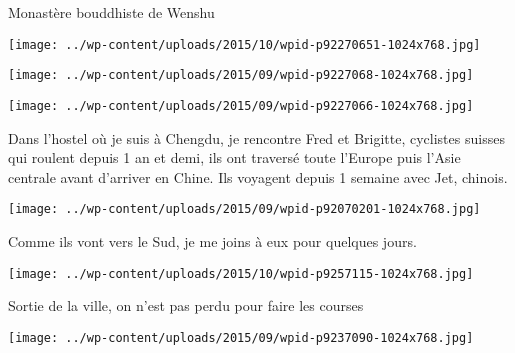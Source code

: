  

 Monastère bouddhiste de Wenshu 

 

\begin{center} \texttt{[image: ../wp-content/uploads/2015/10/wpid-p92270651-1024x768.jpg]} \end{center}

 

 

\begin{center} \texttt{[image: ../wp-content/uploads/2015/09/wpid-p9227068-1024x768.jpg]} \end{center}

 

 

\begin{center} \texttt{[image: ../wp-content/uploads/2015/09/wpid-p9227066-1024x768.jpg]} \end{center}

 

 Dans l'hostel où je suis à Chengdu, je rencontre Fred et Brigitte, cyclistes suisses qui roulent depuis 1 an et demi, ils ont traversé toute l'Europe puis l'Asie centrale avant d'arriver en Chine. Ils voyagent depuis 1 semaine avec Jet, chinois. 

 

\begin{center} \texttt{[image: ../wp-content/uploads/2015/09/wpid-p92070201-1024x768.jpg]} \end{center}

 

 Comme ils vont vers le Sud, je me joins à eux pour quelques jours. 

 

\begin{center} \texttt{[image: ../wp-content/uploads/2015/10/wpid-p9257115-1024x768.jpg]} \end{center}

 

 Sortie de la ville, on n'est pas perdu pour faire les courses 

 

\begin{center} \texttt{[image: ../wp-content/uploads/2015/09/wpid-p9237090-1024x768.jpg]} \end{center}

 

 

